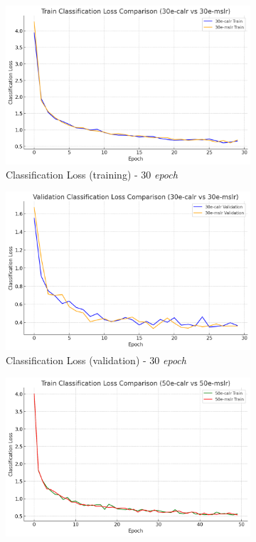 \begin{figure}[htbp]
  \centering
  \begin{subfigure}{0.45\textwidth}
    \includegraphics[width=\textwidth]{gambar/bab4-train-clsloss-30e.png}
    \caption{Classification Loss (training) - 30 \emph{epoch}}
  \end{subfigure}
  \hfill
  \begin{subfigure}{0.45\textwidth}
    \includegraphics[width=\textwidth]{gambar/bab4-val-clsloss-30e.png}
    \caption{Classification Loss (validation) - 30 \emph{epoch}}
  \end{subfigure}
  \hfill
  \begin{subfigure}{0.45\textwidth}
    \includegraphics[width=\textwidth]{gambar/bab4-train-clsloss-50e.png}

\end{subfigure}
\end{figure}
